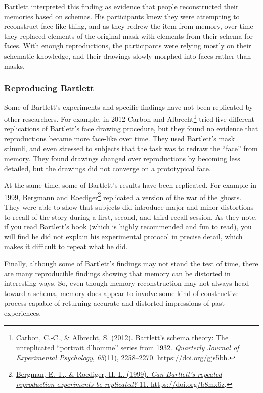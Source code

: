 \documentclass[
  oneside,
  12pt]{crumpbook}
\begin{document}
Bartlett interpreted this finding as evidence that people reconstructed their memories based on schemas. His participants knew they were attempting to reconstruct face-like thing, and as they redrew the item from memory, over time they replaced elements of the original mask with elements from their schema for faces. With enough reproductions, the participants were relying mostly on their schematic knowledge, and their drawings slowly morphed into faces rather than masks.

\hypertarget{reproducing-bartlett}{%
\subsubsection{Reproducing Bartlett}\label{reproducing-bartlett}}

Some of Bartlett's experiments and specific findings have not been replicated by other researchers. For example, in 2012 Carbon and Albrecht\footnote{\protect\hyperlink{ref-carbonBartlettSchemaTheory2012}{Carbon, C.-C., \& Albrecht, S. (2012). Bartlett's schema theory: {The} unreplicated {``portrait d'homme''} series from 1932. \emph{Quarterly Journal of Experimental Psychology}, \emph{65}(11), 2258--2270. \url{https://doi.org/gjs5bh}}.} tried five different replications of Bartlett's face drawing procedure, but they found no evidence that reproductions became more face-like over time. They used Bartlett's mask stimuli, and even stressed to subjects that the task was to redraw the ``face'' from memory. They found drawings changed over reproductions by becoming less detailed, but the drawings did not converge on a prototypical face.

At the same time, some of Bartlett's results have been replicated. For example in 1999, Bergmann and Roediger\footnote{\protect\hyperlink{ref-bergmanCanBartlettRepeated1999}{Bergman, E. T., \& Roediger, H. L. (1999). \emph{Can {Bartlett}'s repeated reproduction experiments be replicated?} 11. \url{https://doi.org/b8mx6z}}.} replicated a version of the war of the ghosts. They were able to show that subjects did introduce major and minor distortions to recall of the story during a first, second, and third recall session. As they note, if you read Bartlett's book (which is highly recommended and fun to read), you will find he did not explain his experimental protocol in precise detail, which makes it difficult to repeat what he did.

Finally, although some of Bartlett's findings may not stand the test of time, there are many reproducible findings showing that memory can be distorted in interesting ways. So, even though memory reconstruction may not always head toward a schema, memory does appear to involve some kind of constructive process capable of returning accurate and distorted impressions of past experiences.
\end{document}
